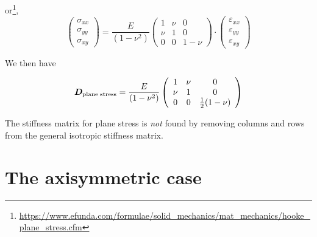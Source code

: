 or\footnote{\url{https://www.efunda.com/formulae/solid_mechanics/mat_mechanics/hooke_plane_stress.cfm}}, 
\begin{equation}
\left(
\begin{array}{c}
\sigma_{xx}\\
\sigma_{yy}\\
\sigma_{xy}
\end{array}
\right)
=\frac{E}{(1-\nu^2)}
\left(
\begin{array}{ccc}
1 & \nu & 0 \\
\nu & 1 & 0 \\
0 &0 &1-\nu
\end{array}
\right)
\cdot
\left(
\begin{array}{c}
\varepsilon_{xx}\\
\varepsilon_{yy}\\
\varepsilon_{xy}
\end{array}
\right)
\end{equation}


We then have
\begin{mdframed}[backgroundcolor=blue!5]
\begin{equation}
{\bm D}_{\rm plane \; stress} = 
\frac{E}{(1-\nu^2)}
\left(
\begin{array}{ccc}
1 & \nu & 0 \\
\nu & 1 & 0 \\
0 &0 &\frac12(1-\nu)
\end{array}
\right)
\end{equation}
\end{mdframed}

\begin{remark}
The stiffness matrix for plane stress is {\it not} found by removing columns and rows from the general isotropic stiffness matrix. 
\end{remark}



\section{The axisymmetric case} \label{ss:fem_elast_axissymm}

